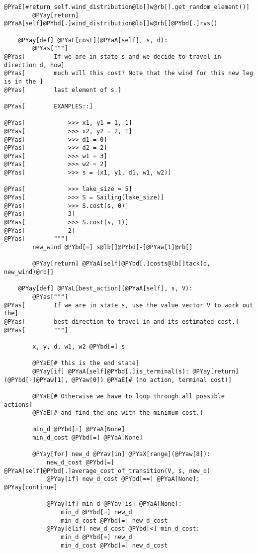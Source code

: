 \begin{Verbatim}[commandchars=@\[\]]
        @PYaE[#return self.wind_distribution@lb[]w@rb[].get_random_element()]
        @PYay[return] @PYaA[self]@PYbd[.]wind_distribution@lb[]w@rb[]@PYbd[.]rvs()

    @PYay[def] @PYaL[cost](@PYaA[self], s, d):
        @PYas["""]
@PYas[        If we are in state s and we decide to travel in direction d, how]
@PYas[        much will this cost? Note that the wind for this new leg is in the ]
@PYas[        last element of s.]

@PYas[        EXAMPLES::]

@PYas[            >>> x1, y1 = 1, 1]
@PYas[            >>> x2, y2 = 2, 1]
@PYas[            >>> d1 = 0]
@PYas[            >>> d2 = 2]
@PYas[            >>> w1 = 3]
@PYas[            >>> w2 = 2]
@PYas[            >>> s = (x1, y1, d1, w1, w2)]

@PYas[            >>> lake_size = 5]
@PYas[            >>> S = Sailing(lake_size)]
@PYas[            >>> S.cost(s, 0)]
@PYas[            3]
@PYas[            >>> S.cost(s, 1)]
@PYas[            2]
@PYas[        """]
        new_wind @PYbd[=] s@lb[]@PYbd[-]@PYaw[1]@rb[]

        @PYay[return] @PYaA[self]@PYbd[.]costs@lb[]tack(d, new_wind)@rb[]

    @PYay[def] @PYaL[best_action](@PYaA[self], s, V):
        @PYas["""]
@PYas[        If we are in state s, use the value vector V to work out the]
@PYas[        best direction to travel in and its estimated cost.]
@PYas[        """]

        x, y, d, w1, w2 @PYbd[=] s

        @PYaE[# this is the end state]
        @PYay[if] @PYaA[self]@PYbd[.]is_terminal(s): @PYay[return] (@PYbd[-]@PYaw[1], @PYaw[0]) @PYaE[# (no action, terminal cost)]

        @PYaE[# Otherwise we have to loop through all possible actions]
        @PYaE[# and find the one with the minimum cost.]

        min_d @PYbd[=] @PYaA[None]
        min_d_cost @PYbd[=] @PYaA[None]

        @PYay[for] new_d @PYav[in] @PYaX[range](@PYaw[8]):
            new_d_cost @PYbd[=] @PYaA[self]@PYbd[.]average_cost_of_transition(V, s, new_d)
            @PYay[if] new_d_cost @PYbd[==] @PYaA[None]: @PYay[continue]

            @PYay[if] min_d @PYav[is] @PYaA[None]:
                min_d @PYbd[=] new_d
                min_d_cost @PYbd[=] new_d_cost
            @PYay[elif] new_d_cost @PYbd[<] min_d_cost:
                min_d @PYbd[=] new_d
                min_d_cost @PYbd[=] new_d_cost


\end{Verbatim}
